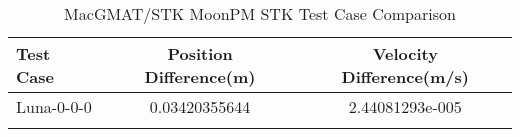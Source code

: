 \begin{table}[htbp!]
\centering
\caption{ MacGMAT/STK MoonPM STK Test Case Comparison}
      \begin{tabular}{lcc}
      \hline\hline
          Test Case & Position Difference(m) & Velocity Difference(m/s) \\
         \hline
         Luna-0-0-0 & 0.03420355644 & 2.44081293e-005 \\
      \hline\hline
      \label{Table: MoonPM STK Table} 
\end{tabular}
\end{table}
